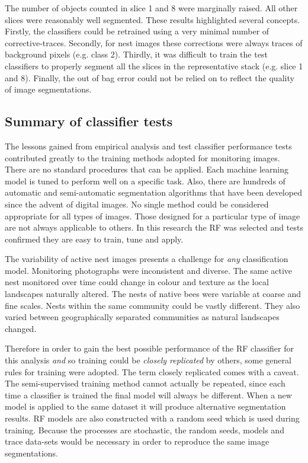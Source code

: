 The number of objects counted in slice 1 and 8 were marginally raised. All other slices were reasonably well segmented. These results highlighted several concepts.  Firstly, the classifiers could be retrained using a very minimal number of corrective-traces. Secondly, for nest images these corrections were always traces of background pixels (e.g. class 2). Thirdly, it was difficult to train the test classifiers to properly segment all the slices in the representative stack (e.g. slice 1 and 8). Finally, the out of bag error could not be relied on to reflect the quality of image segmentations.

\subsection{Summary of classifier tests}
The lessons gained from empirical analysis and test classifier performance tests contributed greatly to the training methods adopted for monitoring images. There are no standard procedures that can be applied. Each machine learning model is tuned to perform well on a specific task. Also, there are hundreds of automatic and semi-automatic segmentation algorithms that have been developed since the advent of digital images. No single method could be considered appropriate for all types of images. Those designed for a particular type of image are not always applicable to others. In this research the \ac{RF} was selected and tests confirmed they are easy to train, tune and apply.

The variability of active nest images presents a challenge for \emph{any} classification model. Monitoring photographs were inconsistent and diverse. The same active nest monitored over time could change in colour and texture as the local landscapes naturally altered. The nests of native bees were variable at coarse and fine scales. Nests within the same community could be vastly different. They also varied between geographically separated communities as natural landscapes changed.

Therefore in order to gain the best possible performance of the \ac{RF} classifier for this analysis \emph{and} so training could be \emph{closely replicated} by others, some general rules for training were adopted. The term closely replicated comes with a caveat. The semi-supervised training method cannot actually be repeated, since each time a classifier is trained the final model will always be different. When a new model is applied to the same dataset it will produce alternative segmentation results. \ac{RF} models are also constructed with a random seed which is used during training. Because the processes are stochastic, the random seeds, models and trace data-sets would be necessary in order to reproduce the same image segmentations.

